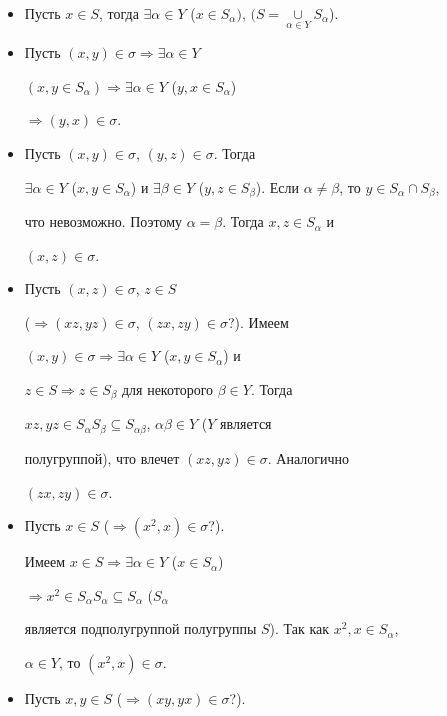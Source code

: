 \begin{itemize} 


\item[$\alpha)$] Пусть $x\in S$, тогда $\exists\alpha\in Y$ ($x\in 


S_\alpha)$, $(S=\mathop{\cup}\limits_{\alpha\in Y}S_\alpha$). 


\item[$\beta)$] Пусть $(x,y)\in\sigma\Rightarrow\exists\alpha\in Y$ 


$(x,y\in S_\alpha)\Rightarrow\exists\alpha\in Y$ ($y,x\in S_\alpha$) 


$\Rightarrow(y,x)\in \sigma$. 


\item[$\gamma)$] Пусть $(x,y)\in\sigma$, $(y,z)\in\sigma$. Тогда 


$\exists\alpha\in Y$ ($x,y\in S_\alpha$) и $\exists\beta\in Y$ ($y,z\in 


S_\beta$). Если $\alpha\ne\beta$, то $y\in S_\alpha\cap S_\beta$, 


что невозможно. Поэтому $\alpha=\beta$. Тогда $x,z\in S_\alpha$ и 


$(x,z)\in\sigma$. 


\item[$\delta)$] Пусть $(x,z)\in\sigma$, $z\in S$ 


($\Rightarrow(xz,yz)\in\sigma$, $(zx,zy)\in\sigma$?). Имеем 


$(x,y)\in\sigma\Rightarrow\exists\alpha\in Y$ ($x,y\in S_\alpha$) и 


$z\in S\Rightarrow z\in S_\beta$ для некоторого $\beta\in Y$. Тогда 


$xz,yz\in S_\alpha S_\beta 


\subseteq S_{\alpha\beta}$, $\alpha\beta\in Y$ ($Y$ является 


полугруппой), что влечет $(xz,yz)\in\sigma$. Аналогично 


$(zx,zy)\in\sigma$. 


\item[$\varepsilon)$] Пусть $x\in S$ ($\Rightarrow(x^2,x)\in\sigma$?). 


Имеем $x\in S\Rightarrow\exists\alpha\in Y$ ($x\in S_\alpha$) 


$\Rightarrow x^2\in S_\alpha S_\alpha\subseteq S_\alpha$ ($S_\alpha$ 


является подполугруппой полугруппы $S$). Так как $x^2,x\in S_\alpha$, 


$\alpha\in Y$, то $(x^2,x)\in\sigma$. 


\item[$\zeta)$] Пусть $x,y\in S$ ($\Rightarrow(xy,yx)\in\sigma$?). 



\end{itemize}
